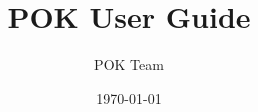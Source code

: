 \documentclass[oneside]{book}
\begin{document}
\title{POK User Guide}

\author{POK Team}

\date{\today}


\maketitle

\tableofcontents

\listoffigures




















\end{document}
